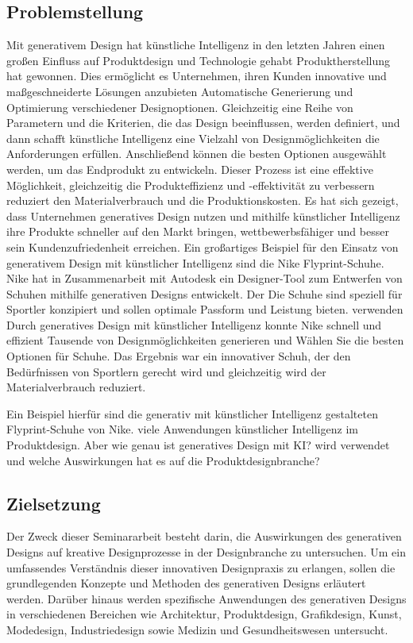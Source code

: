 \subsection*{Problemstellung}
Mit generativem Design hat künstliche Intelligenz  in den letzten Jahren einen großen Einfluss auf  Produktdesign und Technologie gehabt 
 Produktherstellung hat gewonnen. Dies ermöglicht es Unternehmen, ihren Kunden innovative und maßgeschneiderte Lösungen anzubieten 
 Automatische Generierung und Optimierung verschiedener Designoptionen. Gleichzeitig eine Reihe von Parametern 
 und die Kriterien, die das Design beeinflussen, werden definiert, und dann schafft künstliche Intelligenz eine Vielzahl von Designmöglichkeiten 
 die Anforderungen erfüllen. Anschließend können die besten Optionen ausgewählt werden, um das Endprodukt zu entwickeln.  Dieser Prozess ist eine effektive Möglichkeit, gleichzeitig die Produkteffizienz und -effektivität zu verbessern  
 reduziert den Materialverbrauch und die Produktionskosten. Es hat sich gezeigt, dass Unternehmen generatives Design nutzen 
 und mithilfe künstlicher Intelligenz  ihre Produkte schneller auf den Markt bringen, wettbewerbsfähiger  und besser sein 
 Kundenzufriedenheit erreichen. 
  Ein großartiges Beispiel für den Einsatz von generativem Design mit künstlicher Intelligenz sind die Nike Flyprint-Schuhe. 
 Nike hat in Zusammenarbeit mit Autodesk ein Designer-Tool zum Entwerfen von Schuhen mithilfe generativen Designs entwickelt. Der 
 Die Schuhe sind speziell für Sportler konzipiert und sollen optimale Passform und Leistung bieten. verwenden 
 Durch generatives Design mit künstlicher Intelligenz konnte Nike schnell und effizient Tausende von Designmöglichkeiten generieren und 
 Wählen Sie die besten Optionen für Schuhe. Das Ergebnis war ein innovativer Schuh, der den Bedürfnissen von Sportlern gerecht wird 
  und gleichzeitig wird der Materialverbrauch reduziert. 
 
 Ein Beispiel hierfür sind die generativ mit künstlicher Intelligenz gestalteten Flyprint-Schuhe von Nike. 
 viele Anwendungen  künstlicher Intelligenz im Produktdesign. Aber wie genau ist generatives Design mit KI? 
 wird verwendet und welche Auswirkungen hat es auf die Produktdesignbranche?

 \subsection*{Zielsetzung}
 Der Zweck dieser Seminararbeit besteht darin, die Auswirkungen des generativen Designs auf kreative Designprozesse in der Designbranche zu untersuchen. Um ein umfassendes Verständnis dieser innovativen Designpraxis zu erlangen, sollen die grundlegenden Konzepte und Methoden des generativen Designs erläutert werden. Darüber hinaus werden spezifische Anwendungen des generativen Designs in verschiedenen Bereichen wie Architektur, Produktdesign, Grafikdesign, Kunst, Modedesign, Industriedesign sowie Medizin und Gesundheitswesen untersucht. 
 
